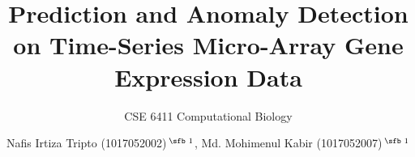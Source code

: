 \documentclass{bioinfo}
\begin{document}

\subtitle{CSE 6411 Computational Biology}

\title[short Title]{Prediction and Anomaly Detection on Time-Series
Micro-Array Gene Expression Data}
\author[Sample \textit{et~al}.]{Nafis Irtiza Tripto (1017052002)\,$^{\text{\sfb 1}}$, Md. Mohimenul Kabir (1017052007)\,$^{\text{\sfb 1}}$}
\address{$^{\text{\sf 1}}$Depatment of CSE, BUET\\}




\abstract{

}

\maketitle






%



%
%
%
%
%
% 







\end{document}
